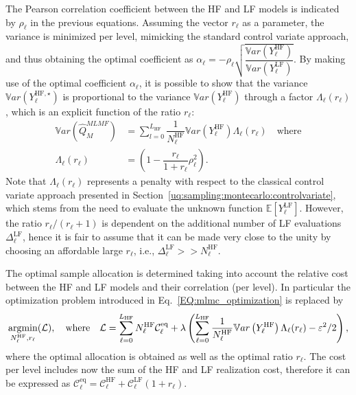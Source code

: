 The Pearson correlation coefficient between the HF and LF models is indicated by $\rho_\ell$ in the previous equations.
Assuming the vector $r_\ell$ as a parameter, the variance is minimized per level, mimicking the standard control variate 
approach, and thus obtaining the optimal coefficient as 
$\alpha_\ell = -\rho_\ell \sqrt{ \dfrac{ \mathbb{V}ar\left( Y^{\mathrm{HF}}_{\ell} \right) } 
                                { \mathbb{V}ar\left( Y^{\mathrm{LF}}_{\ell}  \right)     }}$. 
By making use of the optimal coefficient $\alpha_\ell$, it is possible to show that the variance $\mathbb{V}ar\left(Y^{\mathrm{HF},\star}_{\ell}\right)$ 
is proportional to the variance $\mathbb{V}ar\left(Y^{\mathrm{HF}}_{\ell}\right)$ through a factor $\Lambda_{\ell}(r_\ell)$, which is an explicit 
function of the ratio $r_\ell$:
\begin{equation}\label{EQ: MLMF variance}
\begin{split}
 \mathbb{V}ar\left(\hat{Q}_M^{MLMF}\right) &= \sum_{l=0}^{L_{\mathrm{HF}}} \dfrac{1}{N_{\ell}^{\mathrm{HF}}} \mathbb{V}ar\left(Y^{\mathrm{HF}}_{\ell}\right)
 \Lambda_{\ell}(r_\ell) \quad \mathrm{where} \\
 \Lambda_{\ell}(r_\ell) &= \left( 1 - \dfrac{r_\ell}{1+r_\ell}\rho_\ell^2 \right).
\end{split}
\end{equation}
Note that $\Lambda_{\ell}(r_\ell)$ represents a penalty with respect to the classical 
control variate approach presented in Section~\ref{uq:sampling:montecarlo:controlvariate}, which stems from 
the need to evaluate the unknown function $\mathbb{E}\left[Y^{\mathrm{LF}}_{\ell}\right]$. However, the ratio $r_\ell/(r_\ell+1)$ is dependent 
on the additional number of LF evaluations $\Delta_{\ell}^{\mathrm{LF}}$, hence it is fair to assume that it 
can be made very close to the unity by choosing an affordable large $r_\ell$, i.e., $\Delta_{\ell}^{\mathrm{LF}} >> N_{\ell}^{\mathrm{HF}}$.

The optimal sample allocation is determined taking into account the relative cost between the HF and LF models and their correlation (per level).
In particular the optimization problem introduced in Eq.~\ref{EQ:mlmc_optimization} is replaced by
 \begin{equation*}
  \operatornamewithlimits{argmin}\limits_{N_{\ell}^{\mathrm{HF}}, r_\ell}(\mathcal{L}), \quad \mathrm{where} \quad \mathcal{L} = \sum_{\ell=0}^{L_{\mathrm{HF}}} N_{\ell}^{\mathrm{HF}} \mathcal{C}_{\ell}^{\mathrm{eq}} +
                 \lambda \left( \sum_{\ell=0}^{L_{\mathrm{HF}}} \dfrac{1}{N_{\ell}^{\mathrm{HF}}}\mathbb{V}ar\left( Y^{\mathrm{HF}}_{\ell}\right) \Lambda_{\ell}(r_\ell) - \varepsilon^2/2 \right),
 \end{equation*}
where the optimal allocation is obtained as well as the optimal ratio $r_\ell$. The cost per level includes now the sum of the HF and LF realization cost,
therefore it can be expressed as $\mathcal{C}_{\ell}^{\mathrm{eq}} = \mathcal{C}_{\ell}^{\mathrm{HF}} + \mathcal{C}_{\ell}^{\mathrm{LF}} (1+r_\ell)$.

